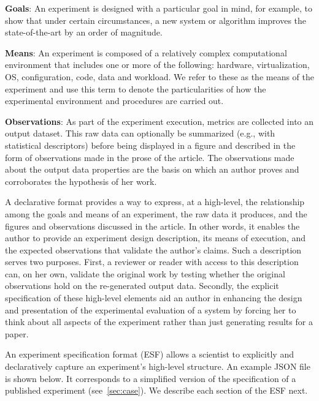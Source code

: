 \documentclass[10pt,reprint]{sigplanconf}
\renewcommand*{\hyperref}[2][\ar]{\def\ar{#2}#2\autoref{#1}}
\begin{document}
\textbf{Goals}: An experiment is designed with a particular goal in
mind, for example, to show that under certain circumstances, a new
system or algorithm improves the state-of-the-art by an order of
magnitude.

\textbf{Means}: An experiment is composed of a relatively complex
computational environment that includes one or more of the following:
hardware, virtualization, OS, configuration, code, data and workload. We
refer to these as the means of the experiment and use this term to
denote the particularities of how the experimental environment and
procedures are carried out.

\textbf{Observations}: As part of the experiment execution, metrics are
collected into an output dataset. This raw data can optionally be
summarized (e.g., with statistical descriptors) before being displayed
in a figure and described in the form of observations made in the prose
of the article. The observations made about the output data properties
are the basis on which an author proves and corroborates the hypothesis
of her work.

A declarative format provides a way to express, at a high-level, the
relationship among the goals and means of an experiment, the raw data it
produces, and the figures and observations discussed in the article. In
other words, it enables the author to provide an experiment design
description, its means of execution, and the expected observations that
validate the author's claims. Such a description serves two purposes.
First, a reviewer or reader with access to this description can, on her
own, validate the original work by testing whether the original
observations hold on the re-generated output data. Secondly, the
explicit specification of these high-level elements aid an author in
enhancing the design and presentation of the experimental evaluation of
a system by forcing her to think about all aspects of the experiment
rather than just generating results for a paper.


An experiment specification format (ESF) allows a scientist to
explicitly and declaratively capture an experiment's high-level
structure. An example JSON file is shown below. It corresponds to a
simplified version of the specification of a published experiment
(\hyperref[sec:case]{see~}). We describe each section of the ESF next.
\end{document}
